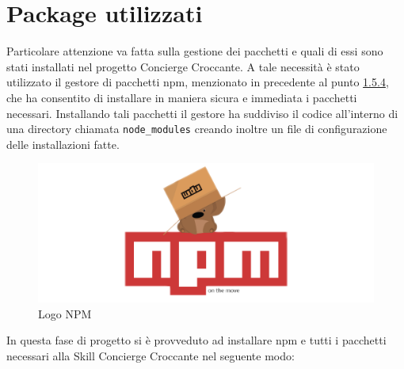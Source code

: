 \section{Package utilizzati}
Particolare attenzione va fatta sulla gestione dei pacchetti e quali di essi sono stati installati nel progetto Concierge Croccante. A tale necessità è stato utilizzato il gestore di pacchetti npm, menzionato in precedente al punto \hyperref[npm]{1.5.4}, che ha consentito di installare in maniera sicura e immediata i pacchetti necessari. Installando tali pacchetti il gestore ha suddiviso il codice all'interno di una directory chiamata \texttt{node\_modules} creando inoltre un file di configurazione delle installazioni fatte.
\begin{figure}[H]
	\includegraphics[width=12cm]{immagini/logo-npm.png}
	\caption{\label{fig:logo_npm}Logo NPM}
\end{figure}
\noindent In questa fase di progetto si è provveduto ad installare npm e tutti i pacchetti necessari alla Skill Concierge Croccante nel seguente modo:
